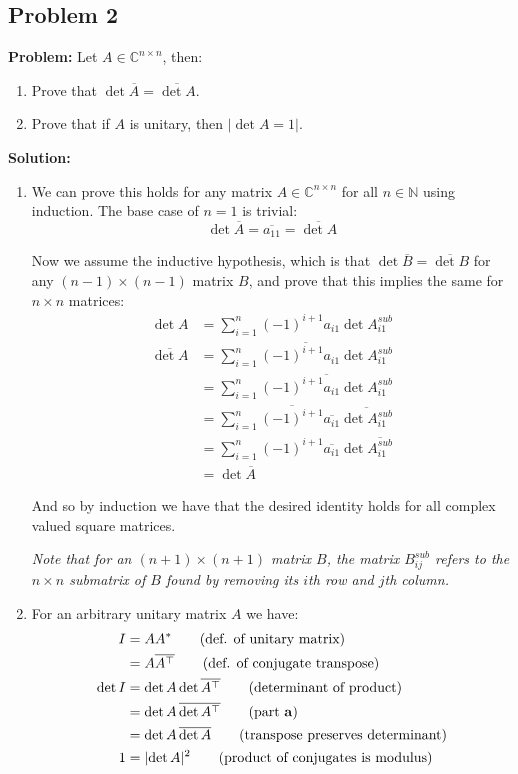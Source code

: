 \documentclass{article}
\begin{document}
\subsection*{Problem 2}
\noindent\textbf{Problem:} Let $A\in\mathbb C^{n\times n}$, then:
\begin{enumerate}[label=\textbf{\alph*)}]
  \item Prove that $\det\overline{A}=\overline{\det A}$.
  \item Prove that if $A$ is unitary, then $\lvert\det A=1\rvert$.
\end{enumerate}
\bigskip

\noindent\textbf{Solution:} 
\begin{enumerate}[label=\textbf{\alph*)}]
  \item We can prove this holds for any matrix $A\in\mathbb C^{n\times n}$ for all $n\in\mathbb N$ using induction. The base case of $n=1$ is trivial:
    $$\det\overline{A}=\overline{a_{11}}=\overline{\det A}$$

  Now we assume the inductive hypothesis, which is that $\det\overline{B}=\overline{\det B}$ for any $(n-1)\times(n-1)$ matrix $B$, and prove that this implies the same for $n\times n$ matrices:
  \begin{align*}
    \det A&=\sum_{i=1}^n(-1)^{i+1}a_{i1}\det A^{sub}_{i1}\tag{cofactor expansion over column 1}\\
    \overline{\det A}&=\overline{\sum_{i=1}^n(-1)^{i+1}a_{i1}\det A^{sub}_{i1}}\\
    &=\sum_{i=1}^n\overline{(-1)^{i+1}a_{i1}\det A^{sub}_{i1}}\tag{sum of conjugates}\\
    &=\sum_{i=1}^n\overline{(-1)^{i+1}}\overline{a_{i1}}\overline{\det A^{sub}_{i1}}\tag{product of conjugates}\\
    &=\sum_{i=1}^n(-1)^{i+1}\overline{a_{i1}}\det \overline{A^{sub}_{i1}}\tag{inductive hypothesis}\\
    &=\det \overline{A}\tag{cofactor expansion over column 1}
  \end{align*}

  And so by induction we have that the desired identity holds for all complex valued square matrices.

  \textit{Note that for an $(n+1)\times (n+1)$ matrix $B$, the matrix $B^{sub}_{ij}$ refers to the $n\times n$ submatrix of $B$ found by removing its $i$th row and $j$th column.}

  \item For an arbitrary unitary matrix $A$ we have:
    \begin{align*}
      I&=AA^*\tag{def. of unitary matrix}\\
      &=A\overline{A^\top}\tag{def. of conjugate transpose}\\
      \det I&=\det A\det \overline{A^\top}\tag{determinant of product}\\
      &=\det{A}\,\overline{\det{A^\top}}\tag{part \textbf{a}}\\
      &=\det A\,\overline{\det A}\tag{transpose preserves determinant}\\
      1&=\lvert\det A\rvert^2\tag{product of conjugates is modulus}
    \end{align*}
    

\end{enumerate}
\end{document}
